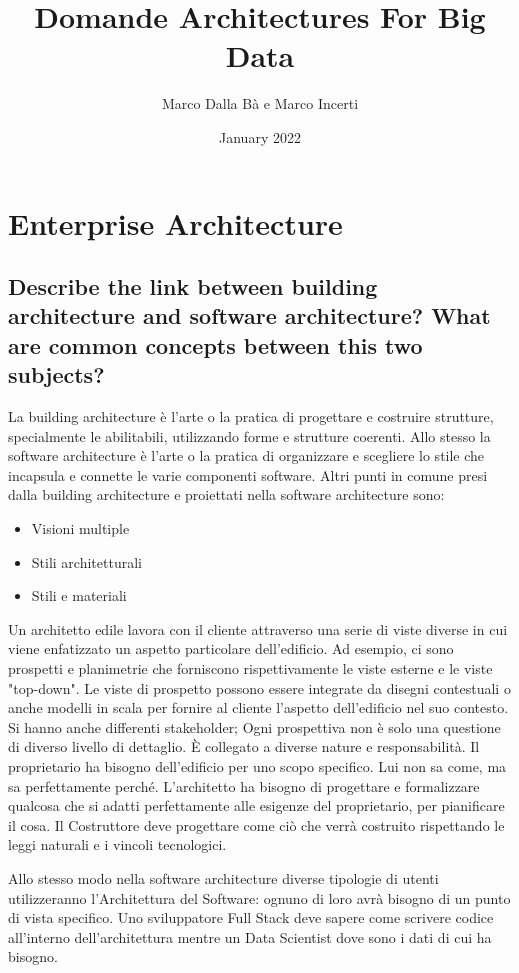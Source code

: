 \documentclass{article}
\title{Domande Architectures For Big Data}
\author{Marco Dalla Bà e Marco Incerti}
\date{January 2022}
\begin{document}
\maketitle
\tableofcontents

\section{Enterprise Architecture}
\subsection{Describe the link between building architecture and software architecture? What are common concepts between this two subjects?}

La building architecture è l’arte o la pratica di progettare e costruire strutture, specialmente le abilitabili, utilizzando forme e strutture coerenti. Allo stesso la software architecture è l’arte o la pratica di organizzare e scegliere lo stile che incapsula e connette le varie componenti software. 
Altri punti in comune presi dalla building architecture e proiettati nella software architecture sono:
\begin{itemize}
    \item Visioni multiple
    \item Stili architetturali
    \item Stili e materiali
\end{itemize}

Un architetto edile lavora con il cliente attraverso una serie di viste diverse in cui viene enfatizzato un aspetto particolare dell'edificio.
Ad esempio, ci sono prospetti e planimetrie che forniscono rispettivamente le viste esterne e le viste "top-down".
Le viste di prospetto possono essere integrate da disegni contestuali o anche modelli in scala per fornire al cliente l'aspetto dell'edificio nel suo contesto.
Si hanno anche differenti stakeholder; Ogni prospettiva non è solo una questione di diverso livello di dettaglio. È collegato a diverse nature e responsabilità.
Il proprietario ha bisogno dell'edificio per uno scopo specifico. Lui non sa come, ma sa perfettamente perché.
L'architetto ha bisogno di progettare e formalizzare qualcosa che si adatti perfettamente alle esigenze del proprietario, per pianificare il cosa.
Il Costruttore deve progettare come ciò che verrà costruito rispettando le leggi naturali e i vincoli tecnologici.

Allo stesso modo nella software architecture diverse tipologie di utenti utilizzeranno l'Architettura del Software: ognuno di loro avrà bisogno di un punto di vista specifico.
Uno sviluppatore Full Stack deve sapere come scrivere codice all'interno dell'architettura mentre un Data Scientist dove sono i dati di cui ha bisogno.
\end{document}
